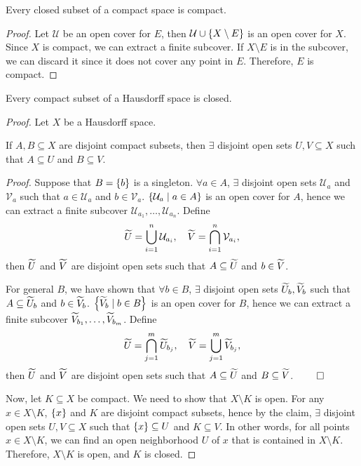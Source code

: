 \begin{prop}
    Every closed subset of a compact space is compact.
    \begin{proof}
        Let $\mathcal U$ be an open cover for $E$, then $\mathcal U \cup \set{X \setminus E}$ is an open cover for $X$. Since $X$ is compact, we can extract a finite subcover. If $X \setminus E$ is in the subcover, we can discard it since it does not cover any point in $E$. Therefore, $E$ is compact.
    \end{proof}
\end{prop}

\begin{prop}
    Every compact subset of a Hausdorff space is closed. 
    \begin{proof}
        Let $X$ be a Hausdorff space.
        \begin{clm}
            If $A, B\subseteq X$ are disjoint compact subsets, then $\exists$ disjoint open sets $U, V \subseteq X$ such that $A \subseteq U$ and $B \subseteq V$.

            \noindent\textit{Proof. }
            Suppose that $B = \set{b}$ is a singleton. $\forall a\in A$, $\exists$ disjoint open sets $\mathcal U_a$ and $\mathcal V_a$ such that $a\in \mathcal U_a$ and $b \in \mathcal V_a$. $\set{\mathcal U_a \mid a\in A}$ is an open cover for $A$, hence we can extract a finite subcover $\mathcal U_{a_1}, \ldots, \mathcal U_{a_n}$. Define
            \[
            \Tilde U = \bigcup_{i=1}^n \mathcal U_{a_i}, \quad \Tilde V = \bigcap_{i=1}^n \mathcal V_{a_i},
            \]
            then $\Tilde U$ and $\Tilde V$ are disjoint open sets such that $A \subseteq \Tilde U$ and $b \in \Tilde V$.

            For general $B$, we have shown that $\forall b\in B$, $\exists$ disjoint open sets $\Tilde U_b, \Tilde V_b$ such that $A \subseteq \Tilde U_b$ and $b \in \Tilde V_b$. $\set{\Tilde V_b \mid b\in B}$ is an open cover for $B$, hence we can extract a finite subcover $\Tilde V_{b_1}, \ldots, \Tilde V_{b_m}$. Define
            \[
            \Tilde U = \bigcap_{j=1}^m \Tilde U_{b_j}, \quad \Tilde V = \bigcup_{j=1}^m \Tilde V_{b_j},
            \]
            then $\Tilde U$ and $\Tilde V$ are disjoint open sets such that $A \subseteq \Tilde U$ and $B \subseteq \Tilde V$. $\qed$
        \end{clm}

        Now, let $K\subseteq X$ be compact. We need to show that $X \setminus K$ is open. For any $x\in X \setminus K$, $\set{x}$ and $K$ are disjoint compact subsets, hence by the claim, $\exists$ disjoint open sets $U, V \subseteq X$ such that $\set{x} \subseteq U$ and $K \subseteq V$. In other words, for all points $x \in X \setminus K$, we can find an open neighborhood $U$ of $x$ that is contained in $X \setminus K$. Therefore, $X \setminus K$ is open, and $K$ is closed.
    \end{proof}
\end{prop}

